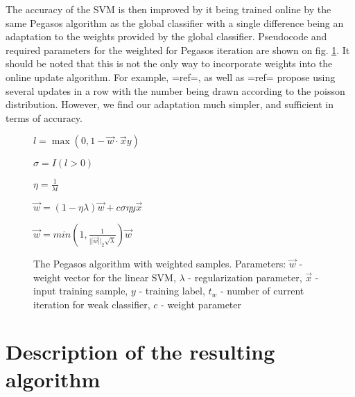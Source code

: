 The accuracy of the SVM is then improved by it being trained online by the same Pegasos algorithm as the global classifier with a single difference being an adaptation to the weights provided by the global classifier. Pseudocode and required parameters for the weighted for Pegasos iteration are shown on fig. \ref{PegasosAl}. It should be noted that this is not the only way to incorporate weights into the online update algorithm. For example, {{=ref=}}, as well as {{=ref=}} propose using several updates in a row with the number being drawn according to the poisson distribution. However, we find our adaptation much simpler, and sufficient in terms of accuracy. 
\begin{figure}[t]

\begin{algorithmic}


$l=\max (0, 1-\vec{w}\cdot\vec{x}y)$

$\sigma=I(l>0)$

$\eta=\frac{1}{\lambda{t}}$

$\vec{w}=(1-\eta\lambda)\vec{w}+{c}\sigma\eta{y}{\vec{x}}$

$\vec{w}=min\left(1,\frac{1}{||\vec{w}||_2\sqrt{\lambda}}\right)\vec{w} $
\EndFunction
\end{algorithmic}
\caption[The Pegasos algorithm with weighted samples]{The Pegasos algorithm with weighted samples. Parameters: $\vec{w}$ - weight vector for the linear SVM, $\lambda$ - regularization parameter, $\vec{x}$ -input training sample, $y$ - training label, $t_w$ - number of current iteration for weak classifier, $c$ - weight parameter 
}
\label{PegasosAl}
\end{figure}
\section{Description of the resulting algorithm}
